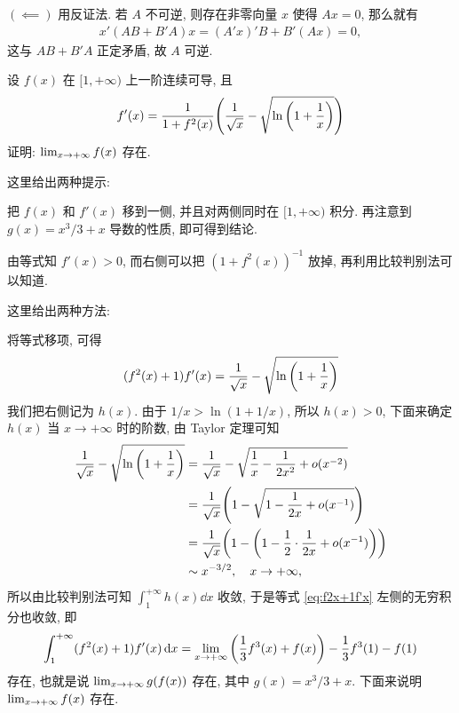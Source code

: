 \begin{exercise}[series=exer]
\begin{answer}
        $ (\impliedby) $ 用反证法. 若 $ A $ 不可逆, 则存在非零向量 $ x $ 使得 $ Ax = 0 $, 那么就有
        \begin{align*}
            x'(AB + B'A)x = (A'x)'B + B'(Ax) = 0,
        \end{align*}
        这与 $ AB + B'A $ 正定矛盾, 故 $ A $ 可逆.
    \end{answer}
    \item 
    \item 设 $ f(x) $ 在 $ [1, +\infty) $ 上一阶连续可导, 且
    \begin{align*}
        f'(x) = \frac{1}{1 + f^{2}(x)}\qty(\frac{1}{\sqrt{x}} - \sqrt{\ln\qty(1 + \frac{1}{x})})
    \end{align*}
    证明: $ \lim_{x \to +\infty}f(x) $ 存在.
    \begin{hint}
        这里给出两种提示:
        \begin{method}
        \item 把 $ f(x) $ 和 $ f'(x) $ 移到一侧, 并且对两侧同时在 $ [1, +\infty) $ 积分. 再注意到 $ g(x) = x^{3}/3 + x $ 导数的性质, 即可得到结论.
        \item 由等式知 $ f'(x) > 0 $, 而右侧可以把 $ (1 + f^{2}(x))^{-1} $ 放掉, 再利用比较判别法可以知道. 
        \end{method}
    \end{hint}
    \begin{answer}
        这里给出两种方法:
        \begin{method}
            \item\label{method:移项积分} 将等式移项, 可得
            \begin{align}\label{eq:f2x+1f'x}
                (f^{2}(x) + 1)f'(x) = \frac{1}{\sqrt{x}} - \sqrt{\ln\qty(1 + \frac{1}{x})}
            \end{align}
            我们把右侧记为 $ h(x) $. 由于 $ 1/x > \ln(1 + 1/x) $, 所以 $ h(x) > 0 $, 下面来确定 $ h(x) $ 当 $ x \to +\infty $ 时的阶数, 由 Taylor 定理可知
            \begin{align*}
                \frac{1}{\sqrt{x}} - \sqrt{\ln\qty(1 + \frac{1}{x})} & = \frac{1}{\sqrt{x}} - \sqrt{\frac{1}{x} - \frac{1}{2x^{2}} + o(x^{-2})} \\
                & = \frac{1}{\sqrt{x}}\qty(1 - \sqrt{1 - \frac{1}{2x} + o(x^{-1})})\\
                & = \frac{1}{\sqrt{x}}\qty(1 - \qty(1 - \frac{1}{2} \cdot \frac{1}{2x} + o(x^{-1})))\\
                & \sim x^{-3/2}, \quad x \to +\infty,
            \end{align*}
            所以由比较判别法可知 $ \int_{1}^{+\infty} h(x) \dd{x} $ 收敛, 于是等式 \eqref{eq:f2x+1f'x} 左侧的无穷积分也收敛, 即
            \begin{align*}
                \int_{1}^{+\infty} (f^{2}(x) + 1)f'(x) \dd{x} = \lim_{x \to +\infty} \qty(\frac{1}{3}f^{3}(x) + f(x)) - \frac{1}{3}f^{3}(1) - f(1)
            \end{align*}
            存在, 也就是说 $ \lim_{x \to +\infty} g(f(x)) $ 存在, 其中 $ g(x) = x^{3}/3 + x $. 下面来说明 $ \lim_{x \to +\infty} f(x) $ 存在.


\end{method}
\end{answer}
\end{exercise}
